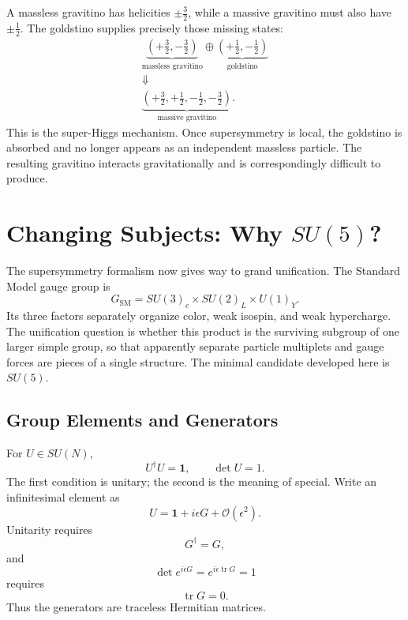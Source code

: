 A massless gravitino has helicities \(\pm\tfrac32\), while a massive gravitino must also have \(\pm\tfrac12\). The goldstino supplies precisely those missing states:
\begin{equation}
\begin{gathered}
\underbrace{\left(+\frac32,-\frac32\right)}_{\text{massless gravitino}}
\oplus
\underbrace{\left(+\frac12,-\frac12\right)}_{\text{goldstino}}\\
\Downarrow\\
\underbrace{\left(+\frac32,+\frac12,-\frac12,-\frac32\right)}_{\text{massive gravitino}}.
\end{gathered}
\label{eq:l9-super-higgs}
\end{equation}
This is the super-Higgs mechanism. Once supersymmetry is local, the goldstino is absorbed and no longer appears as an independent massless particle. The resulting gravitino interacts gravitationally and is correspondingly difficult to produce.

\section{Changing Subjects: Why \texorpdfstring{\(SU(5)\)}{SU(5)}?}

The supersymmetry formalism now gives way to grand unification. The Standard Model gauge group is
\begin{equation}
G_{\mathrm{SM}}
=SU(3)_c\times SU(2)_L\times U(1)_Y.
\label{eq:l9-sm-group}
\end{equation}
Its three factors separately organize color, weak isospin, and weak hypercharge. The unification question is whether this product is the surviving subgroup of one larger simple group, so that apparently separate particle multiplets and gauge forces are pieces of a single structure. The minimal candidate developed here is \(SU(5)\).

\subsection{Group Elements and Generators}

For \(U\in SU(N)\),
\begin{equation}
U^\dagger U=\mathbf1,
\qquad
\det U=1.
\label{eq:l9-SUN-def}
\end{equation}
The first condition is unitary; the second is the meaning of special. Write an infinitesimal element as
\begin{equation}
U=\mathbf1+i\epsilon G+\mathcal O(\epsilon^2).
\label{eq:l9-infinitesimal-U}
\end{equation}
Unitarity requires
\begin{equation}
G^\dagger=G,
\end{equation}
and
\begin{equation}
\det e^{i\epsilon G}
=e^{i\epsilon\operatorname{tr}G}=1
\end{equation}
requires
\begin{equation}
\operatorname{tr}G=0.
\end{equation}
Thus the generators are traceless Hermitian matrices.

